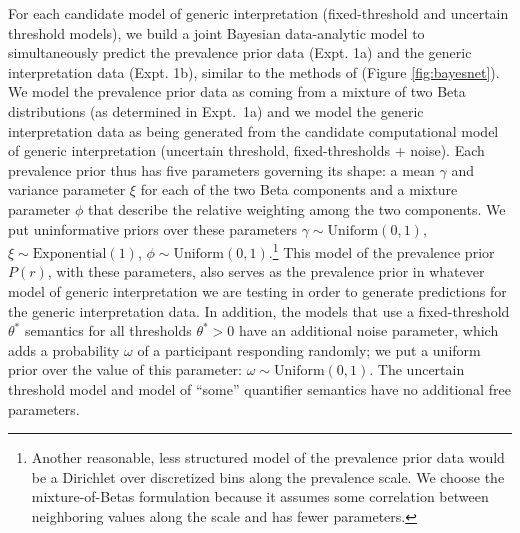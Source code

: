 \documentclass[floatsintext,doc]{apa6}
\let\rmarkdownfootnote\footnote%
\def\footnote{\protect\rmarkdownfootnote}
\begin{document}
For each candidate model of generic interpretation (fixed-threshold and uncertain threshold models), we build a joint Bayesian data-analytic model to simultaneously predict the prevalence prior data (Expt. 1a) and the generic interpretation data (Expt. 1b), similar to the methods of  (Figure \ref{fig:bayesnet}).
We model the prevalence prior data as coming from a mixture of two Beta distributions (as determined in Expt.~1a) and we model the generic interpretation data as being generated from the candidate computational model of generic interpretation (uncertain threshold, fixed-thresholds + noise).
Each prevalence prior thus has five parameters governing its shape: a mean \(\gamma\) and variance parameter \(\xi\) for each of the two Beta components and a mixture parameter $\phi$ that describe the relative weighting among the two components.
We put uninformative priors over these parameters \(\gamma \sim \text{Uniform}(0, 1)\), \(\xi \sim \text{Exponential}(1)\), \(\phi \sim \text{Uniform}(0,1)\).\footnote{Another reasonable, less structured model of the prevalence prior data would be a Dirichlet over discretized bins along the prevalence scale. We choose the mixture-of-Betas formulation because it assumes some correlation between neighboring values along the scale and has fewer parameters. }
This model of the prevalence prior \(P(r)\), with these parameters, also serves as the prevalence prior in whatever model of generic interpretation we are testing in order to generate predictions for the generic interpretation data. 
In addition, the models that use a fixed-threshold $\theta^*$ semantics for all thresholds $\theta^* > 0$ have an additional noise parameter, which adds a probability \(\omega\) of a participant responding randomly; we put a uniform prior over the value of this parameter: \(\omega \sim \text{Uniform}(0, 1)\).
The uncertain threshold model and model of \enquote{some} quantifier semantics have no additional free parameters. 
\end{document}
